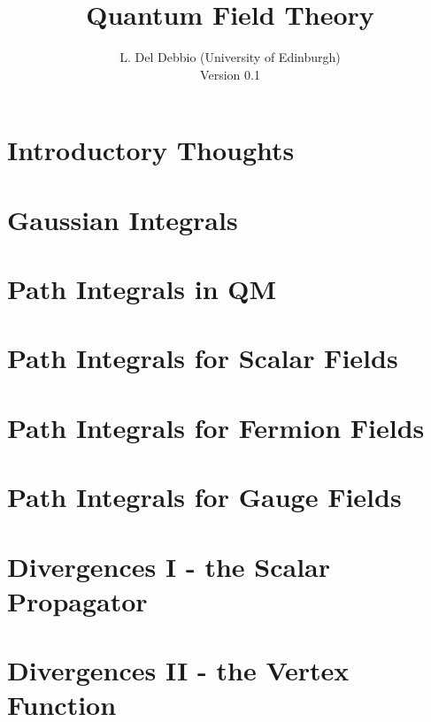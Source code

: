 \documentclass[11pt]{report}
\begin{document}
\title{Quantum Field Theory}
\author{L. Del Debbio (University of Edinburgh)\\
  Version 0.1}

\maketitle
\clearemptydoublepage
\tableofcontents
\clearemptydoublepage


\chapter{Introductory Thoughts}
\label{chap:intro}


\chapter{Gaussian Integrals}
\label{chap:lec0}


\chapter{Path Integrals in QM}
\label{chap:lec1}


\chapter{Path Integrals for Scalar Fields}
\label{cha:path-integr-scal}



\chapter{Path Integrals for Fermion Fields}
\label{cha:path-integr-ferm}


\chapter{Path Integrals for Gauge Fields}
\label{cha:path-integrals-gauge}



\chapter{Divergences I - the Scalar Propagator}
\label{cha:divergences-i-scalar}



\chapter{Divergences II - the Vertex Function}
\label{cha:diverg-ii-vert}

\end{document}
